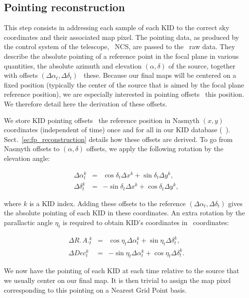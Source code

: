 \subsection{Pointing reconstruction}
\label{se:ptg}

This step consists in addressing each sample of each KID to the correct sky
coordinates and their associated map pixel. The pointing data, as
produced by the control system of the telescope, \aka\ NCS, are passed to the
\nika\ raw data. They describe the absolute pointing of a reference
point in the focal plane in various quantities, the
absolute azimuth and elevation $(\alpha,\delta)$ of the source, together with
offsets $(\Delta\alpha_t, \Delta\delta_t)$ \wrt~these. Because our final maps
will be centered on a fixed position (typically the center of the source that is
aimed by the focal plane reference position), we are especially interested in
pointing offsets \wrt~this position. We therefore detail here the
derivation of these offsets.

We store KID pointing offsets \wrt\ the reference position in Nasmyth $(x,y)$
coordinates (independent of time) once and for all in our KID database
(\aka~\kidpar). Sect.~\ref{se:fp_reconstruction} details how these offsets are
derived. To go from Nasmyth offsets to $(\alpha,\delta)$ offsets, we apply the
following rotation by the elevation angle:

\begin{eqnarray}
\Delta\alpha^k_t &=&  \cos\delta_t \Delta x^k + \sin\delta_t \Delta y^k, \nonumber\\
\Delta\delta^k_t &=& -\sin\delta_t \Delta x^k + \cos\delta_t \Delta y^k, \nonumber
\end{eqnarray}

where $k$ is a KID index. Adding these offsets to the reference $(\Delta
\alpha_t, \Delta \delta_t)$ gives the absolute pointing of each KID in these
coordinates. An extra rotation by the parallactic angle $\eta_t$ is required to
obtain KID's coordinates in \radec\ coordinates:

\begin{eqnarray}
\Delta R.\,A.^k_t &=&  \cos\eta_t \Delta\alpha^k_t + \sin\eta_t \Delta\delta^k_t,\\
\Delta Dec^k_t    &=& -\sin\eta_t \Delta\alpha^k_t + \cos\eta_t \Delta\delta^k_t.
\end{eqnarray}

We now have the pointing of each KID at each time relative to the source that we
usually center on our final map. It is then trivial to assign the map pixel
corresponding to this pointing on a Nearest Grid Point basis.

